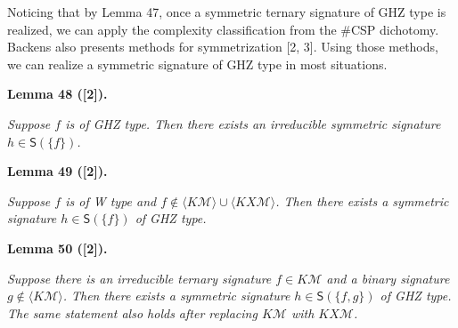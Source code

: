 


Noticing that by Lemma 47, once a symmetric ternary signature of GHZ type is realized, we can apply the complexity classification from the \#CSP dichotomy. Backens also presents methods for symmetrization [2, 3]. Using those methods, we can realize a symmetric signature of GHZ type in most situations.\par





\par\medskip\noindent\textbf{
\textbf{Lemma 48}\textbf{ }([2])\textbf{.}
}\par



\emph{Suppose $f$ is of GHZ type. Then there exists an irreducible symmetric signature $h\in\textsf{S}(\{f\})$.}\par







\par\medskip\noindent\textbf{
\textbf{Lemma 49}\textbf{ }([2])\textbf{.}
}\par



\emph{Suppose $f$ is of W type and $f\notin\langle K\mathcal{M}\rangle\cup\langle KX\mathcal{M}\rangle$. Then there exists a symmetric signature $h\in\textsf{S}(\{f\})$ of GHZ type.}\par







\par\medskip\noindent\textbf{
\textbf{Lemma 50}\textbf{ }([2])\textbf{.}
}\par



\emph{Suppose there is an irreducible ternary signature $f\in K\mathcal{M}$ and a binary signature $g\notin\langle K\mathcal{M}\rangle$. Then there exists a symmetric signature $h\in\textsf{S}(\{f,g\})$ of GHZ type. The same statement also holds after replacing $K\mathcal{M}$ with $KX\mathcal{M}$.}\par






